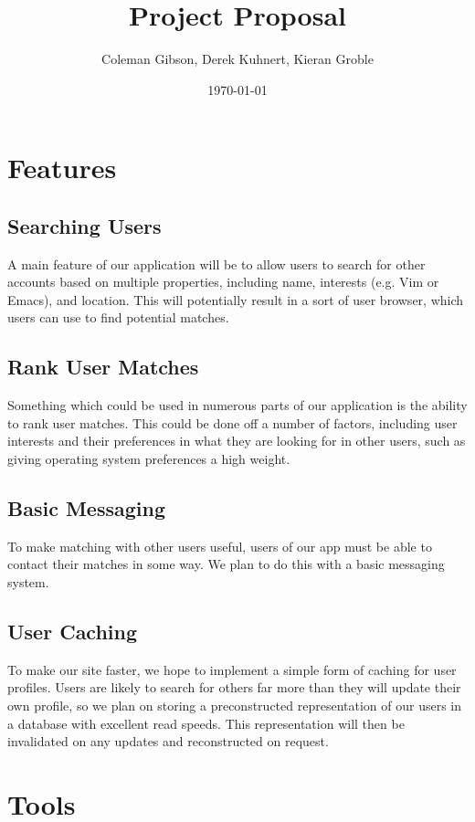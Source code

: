 \documentclass[11pt]{article}
\author{Coleman Gibson, Derek Kuhnert, Kieran Groble}
\date{\today}
\title{Project Proposal}
\begin{document}
\maketitle

\section{Features}
\label{sec:orgd4a8a8d}
\subsection{Searching Users}
\label{sec:orgd67df88}
A main feature of our application will be to allow users to search for other
accounts based on multiple properties, including name, interests (e.g. Vim or
Emacs), and location. This will potentially result in a sort of user browser,
which users can use to find potential matches.

\subsection{Rank User Matches}
\label{sec:orgd87d086}
Something which could be used in numerous parts of our application is the
ability to rank user matches. This could be done off a number of factors,
including user interests and their preferences in what they are looking for
in other users, such as giving operating system preferences a high weight.

\subsection{Basic Messaging}
\label{sec:org3d252ce}
To make matching with other users useful, users of our app must be able to
contact their matches in some way. We plan to do this with a basic messaging
system.

\subsection{User Caching}
\label{sec:org565c37d}
To make our site faster, we hope to implement a simple form of caching for
user profiles. Users are likely to search for others far more than they will
update their own profile, so we plan on storing a preconstructed
representation of our users in a database with excellent read speeds. This
representation will then be invalidated on any updates and reconstructed on
request.


\section{Tools}
\label{sec:org17d197a}
\end{document}
